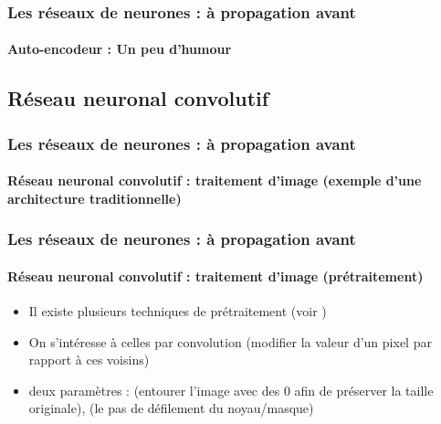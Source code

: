 \documentclass[xcolor=table]{beamer}
\begin{document}
\begin{frame}
\frametitle{Les réseaux de neurones : à propagation avant}
\framesubtitle{Auto-encodeur : Un peu d'humour}


\end{frame}

\subsection{Réseau neuronal convolutif}

\begin{frame}
\frametitle{Les réseaux de neurones : à propagation avant}
\framesubtitle{Réseau neuronal convolutif : traitement d'image (exemple d'une architecture traditionnelle)}

\begin{center}
\end{center}

\end{frame}

\begin{frame}
\frametitle{Les réseaux de neurones : à propagation avant}
\framesubtitle{Réseau neuronal convolutif : traitement d'image (prétraitement)}

\begin{itemize}
	\item Il existe plusieurs techniques de prétraitement (voir \cite{2010-alginahi})
	\item On s'intéresse à celles par convolution (modifier la valeur d'un pixel par rapport à ces voisins)
	\item deux paramètres :  (entourer l'image avec des 0 afin de préserver la taille originale),  (le pas de défilement du noyau/masque)
\end{itemize}

\begin{center}
\end{center}

\end{frame}
\end{document}
